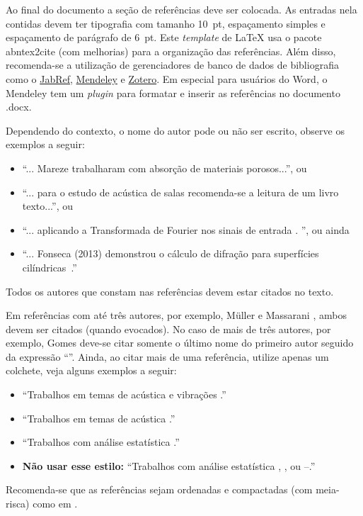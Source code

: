 Ao final do documento a seção de referências deve ser colocada. As entradas nela contidas devem ter tipografia com tamanho 10~pt, espaçamento simples e espaçamento de parágrafo de 6~pt. Este \textit{template} de \LaTeX\xspace usa o pacote {\ttfamily abntex2cite} (com melhorias) para a organização das referências. Além disso, recomenda-se a utilização de gerenciadores de banco de dados de bibliografia como o \href{http://www.jabref.org/}{JabRef}, \href{http://www.mendeley.com}{Mendeley} e \href{https://www.zotero.org/}{Zotero}. Em especial para usuários do Word, o Mendeley tem um \textit{plugin} para formatar e inserir as referências no documento .docx.


Dependendo do contexto, o nome do autor pode ou não ser escrito, observe os exemplos a seguir: 
%
\begin{itemize}[noitemsep,topsep=0ex] \itemsep=4pt
	\item 	``... Mareze \etal \cite{Mareze-2019} trabalharam com absorção de materiais porosos...'', ou 
	
	\item ``... para o estudo de acústica de salas \cite{Brandao-2017} recomenda-se a leitura de um livro texto...'', ou
	\item ``... aplicando a Transformada de Fourier nos sinais de entrada \cite{Oppenheim-2010}. '', ou ainda
	\item ``... Fonseca (2013) demonstrou o cálculo de difração para superfícies cilíndricas~\cite{Fonseca-2013}.''
\end{itemize}
%
Todos os autores que constam nas referências devem estar citados no texto.

Em referências com até três autores, por exemplo, Müller e Massarani \cite{Muller-2001}, ambos devem ser citados (quando evocados). No caso de mais de três autores, por exemplo, Gomes \etal \cite{Gomes-2015} deve-se citar somente o último nome do primeiro autor seguido da expressão ``\etal''. Ainda, ao citar mais de uma referência, utilize apenas um colchete, veja alguns exemplos a seguir:
%
\begin{itemize}[noitemsep,topsep=0ex] \itemsep=8pt
	\item ``Trabalhos em temas de acústica e vibrações \cite{Mareze-2017,Fonseca-2013,Brandao-2017}.''
	\item ``Trabalhos em temas de acústica \cite{Mareze-2017,Oppenheim-2010,Muller-2001,sobrac2018:natal, Mareze-2019, jasa:2022eac}.''
	\item ``Trabalhos com análise estatística \cite{Mareze-2017, Brandao-2017, aev:piccini2020}.''
		\item \textbf{Não usar esse estilo:} ``Trabalhos com análise estatística \cite{Mareze-2017}, \cite{Brandao-2017}, \cite{jasa:2022eac} ou \cite{Mareze-2017}--\cite{jasa:2022eac}.''
\end{itemize}
%
Recomenda-se que as referências sejam ordenadas e compactadas (com meia-risca) como em \cite{Mareze-2017,Oppenheim-2010,Muller-2001,Mareze-2019}.

